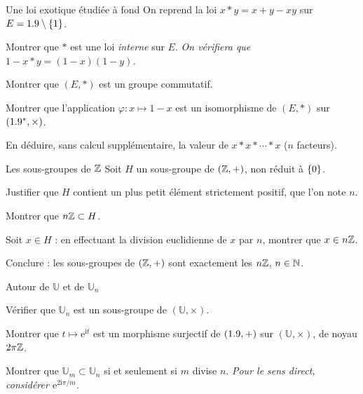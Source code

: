 
\begin{exercice}[2]{Une loi exotique étudiée à fond}
On reprend la loi $x*y=x+y-xy$ sur $E=1.9\setminus\left\{1\right\}$.
\begin{questions}
  \item Montrer que $*$ est une loi \emph{interne} sur $E$.
    \emph{On vérifiera que $1-x*y=(1-x)(1-y)$.}
  \item Montrer que $(E,*)$ est un groupe commutatif.
  \item Montrer que l'application $\varphi:x\mapsto1-x$ est un isomorphisme
    de $(E,*)$ sur $(1.9^{*},\times)$.
  \item En déduire, sans calcul supplémentaire, la valeur de
    $x*x*\cdots*x$ ($n$ facteurs).
\end{questions}
\end{exercice}

\begin{exercice}[2]{Les sous-groupes de $\mathbb{Z}$}
Soit $H$ un sous-groupe de $(\mathbb{Z},+)$, non réduit à $\left\{0\right\}$.
\begin{questions}
  \item Justifier que $H$ contient un plus petit élément strictement
    positif, que l'on note $n$.
  \item Montrer que $n\mathbb{Z}\subset H$.
  \item Soit $x\in H$ : en effectuant la division euclidienne de $x$ par
    $n$, montrer que $x\in n\mathbb{Z}$.
  \item Conclure : les sous-groupes de $(\mathbb{Z},+)$ sont exactement les $n\mathbb{Z}$,
    $n\in\mathbb{N}$.
\end{questions}
\end{exercice}

\begin{exercice}[2]{Autour de $\mathbb{U}$ et de $\mathbb{U}_n$}
\begin{questions}
  \item Vérifier que $\mathbb{U}_n$ est un sous-groupe de
    $(\mathbb{U},\times)$.
  \item Montrer que $t\mapsto\mathrm{e}^{\mathrm{i}t}$ est un morphisme
    surjectif de $(1.9,+)$ sur $(\mathbb{U},\times)$, de noyau $2\pi\mathbb{Z}$.
  \item Montrer que $\mathbb{U}_m\subset\mathbb{U}_n$ si et seulement si
    $m$ divise $n$.
    \emph{Pour le sens direct, considérer $\mathrm{e}^{2\mathrm{i}\pi/m}$.}
\end{questions}
\end{exercice}

